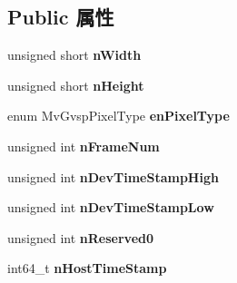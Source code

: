 \subsection*{Public 属性}
\begin{DoxyCompactItemize}
\item 
\mbox{\label{struct___m_v___f_r_a_m_e___o_u_t___i_n_f_o___e_x___af6e45edcf67bd1f48453b378d2572a29}} 
unsigned short {\bfseries n\+Width}
\item 
\mbox{\label{struct___m_v___f_r_a_m_e___o_u_t___i_n_f_o___e_x___aae9a6f9294e2f3d065526af9e4dc77a9}} 
unsigned short {\bfseries n\+Height}
\item 
\mbox{\label{struct___m_v___f_r_a_m_e___o_u_t___i_n_f_o___e_x___a07e2685d6591b3138ac792ed93bb2808}} 
enum Mv\+Gvsp\+Pixel\+Type {\bfseries en\+Pixel\+Type}
\item 
\mbox{\label{struct___m_v___f_r_a_m_e___o_u_t___i_n_f_o___e_x___ae1a4648fba85b39a1ce550762db52597}} 
unsigned int {\bfseries n\+Frame\+Num}
\item 
\mbox{\label{struct___m_v___f_r_a_m_e___o_u_t___i_n_f_o___e_x___a04c4b878503de5919bcb8e5b12123e74}} 
unsigned int {\bfseries n\+Dev\+Time\+Stamp\+High}
\item 
\mbox{\label{struct___m_v___f_r_a_m_e___o_u_t___i_n_f_o___e_x___a656e9c454a223b1eb1fe602843d9ae9a}} 
unsigned int {\bfseries n\+Dev\+Time\+Stamp\+Low}
\item 
\mbox{\label{struct___m_v___f_r_a_m_e___o_u_t___i_n_f_o___e_x___a76fd5ce01f8bb2dd71477973d2b1e026}} 
unsigned int {\bfseries n\+Reserved0}
\item 
\mbox{\label{struct___m_v___f_r_a_m_e___o_u_t___i_n_f_o___e_x___a1e0e21e4812adcdd88d2c9ee9116408d}} 
int64\+\_\+t {\bfseries n\+Host\+Time\+Stamp}
\item 

\end{DoxyCompactItemize}
